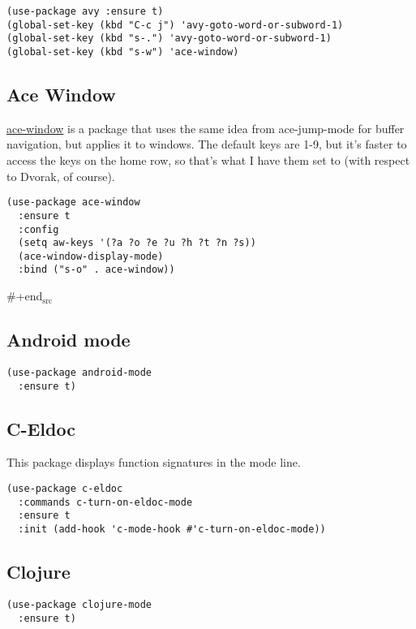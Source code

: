 \documentclass[11pt]{article}
\begin{document}
\begin{verbatim}
(use-package avy :ensure t)
(global-set-key (kbd "C-c j") 'avy-goto-word-or-subword-1)
(global-set-key (kbd "s-.") 'avy-goto-word-or-subword-1)
(global-set-key (kbd "s-w") 'ace-window)
\end{verbatim}
\subsection{Ace Window}
\label{sec-18-3}

\href{https://github.com/abo-abo/ace-window}{ace-window} is a package that uses the same idea from ace-jump-mode for
buffer navigation, but applies it to windows. The default keys are
1-9, but it's faster to access the keys on the home row, so that's
what I have them set to (with respect to Dvorak, of course).

\begin{verbatim}
(use-package ace-window
  :ensure t
  :config
  (setq aw-keys '(?a ?o ?e ?u ?h ?t ?n ?s))
  (ace-window-display-mode)
  :bind ("s-o" . ace-window))
\end{verbatim}
\#+end$_{\text{src}}$

\subsection{Android mode}
\label{sec-18-4}

\begin{verbatim}
(use-package android-mode
  :ensure t)
\end{verbatim}

\subsection{C-Eldoc}
\label{sec-18-5}

This package displays function signatures in the mode line.

\begin{verbatim}
(use-package c-eldoc
  :commands c-turn-on-eldoc-mode
  :ensure t
  :init (add-hook 'c-mode-hook #'c-turn-on-eldoc-mode))
\end{verbatim}

\subsection{Clojure}
\label{sec-18-6}

\begin{verbatim}
(use-package clojure-mode
  :ensure t)
\end{verbatim}
\end{document}
